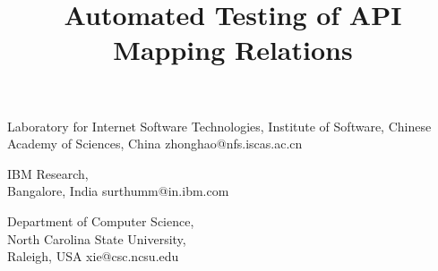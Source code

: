 \documentclass{sigplanconf}
\begin{document}
\copyrightdata{[to be supplied]}


\title{Automated Testing of API Mapping Relations}
{Laboratory for Internet Software Technologies, Institute of Software, Chinese Academy of Sciences, China}
{zhonghao@nfs.iscas.ac.cn}

{IBM Research, \\Bangalore, India}
{surthumm@in.ibm.com}

{Department of Computer Science, \\North Carolina State University, \\Raleigh, USA}
{xie@csc.ncsu.edu}

\maketitle
\end{document}
